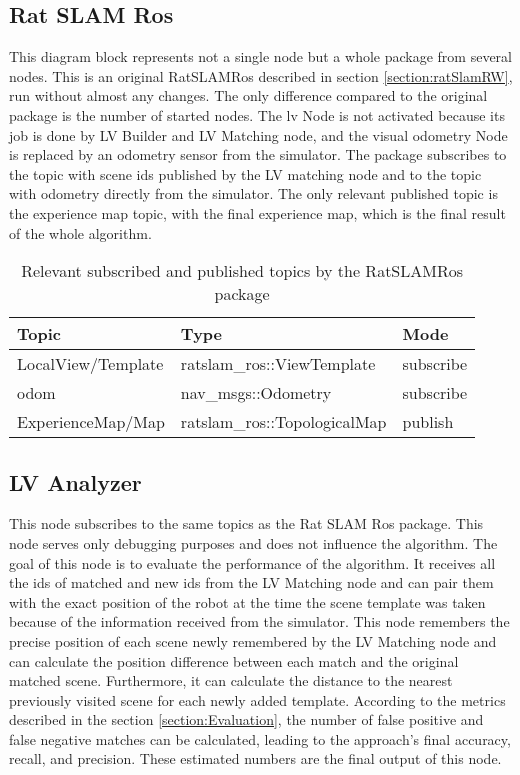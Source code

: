 \subsection{Rat SLAM Ros}

This diagram block represents not a single node but a whole package from several nodes. This is an original RatSLAMRos described in section \ref{section:ratSlamRW}, run without almost any changes. The only difference compared to the original package is the number of started nodes. The lv Node is not activated because its job is done by LV Builder and LV Matching node, and the visual odometry Node is replaced by an odometry sensor from the simulator. The package subscribes to the topic with scene ids published by the LV matching node and to the topic with odometry directly from the simulator. The only relevant published topic is the experience map topic, with the final experience map, which is the final result of the whole algorithm.

\begin{table}[htpb]
    \caption{Relevant subscribed and published topics by the RatSLAMRos package}\label{tab:ratslamTopics}
    \centering
    \begin{tabular}{l l l}
        \toprule
        Topic              & Type                         & Mode      \\
        \midrule
        LocalView/Template & ratslam\_ros::ViewTemplate   & subscribe \\
        odom               & nav\_msgs::Odometry          & subscribe \\
        ExperienceMap/Map  & ratslam\_ros::TopologicalMap & publish   \\
        \bottomrule
    \end{tabular}
\end{table}

\subsection{LV Analyzer}

This node subscribes to the same topics as the Rat SLAM Ros package. This node serves only debugging purposes and does not influence the algorithm. The goal of this node is to evaluate the performance of the algorithm. It receives all the ids of matched and new ids from the LV Matching node and can pair them with the exact position of the robot at the time the scene template was taken because of the information received from the simulator. This node remembers the precise position of each scene newly remembered by the LV Matching node and can calculate the position difference between each match and the original matched scene. Furthermore, it can calculate the distance to the nearest previously visited scene for each newly added template. According to the metrics described in the section \ref{section:Evaluation}, the number of false positive and false negative matches can be calculated, leading to the approach's final accuracy, recall, and precision. These estimated numbers are the final output of this node.


